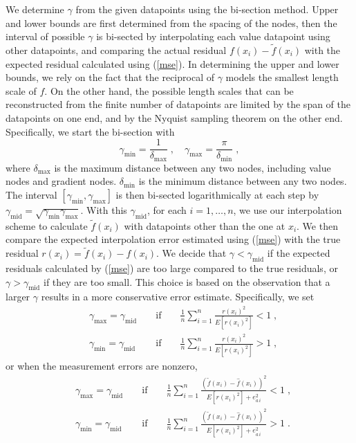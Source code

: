 We determine $\gamma$ from the given datapoints using the bi-section
method.  Upper and lower bounds are first determined from the spacing of the
nodes, then the interval of possible $\gamma$ is bi-sected by interpolating
each value datapoint using other datapoints, and comparing the
actual residual $f(x_i) - {\tilde f}(x_i)$ with the expected residual
calculated using (\ref{mse}).  In determining the upper and lower bounds,
we rely on the fact that the reciprocal of $\gamma$ models the smallest length
scale of $f$.  On the other hand, the possible length scales that can be
reconstructed from the finite number of datapoints are limited by the span of
the datapoints on one end, and by the Nyquist sampling theorem on the other
end.  Specifically, we start the bi-section with
\[ \gamma_{\min} = \frac{1}{\delta_{\max}}\;, \quad
   \gamma_{\max} = \frac{\pi}{\delta_{\min}}\;, \]
where $\delta_{\max}$ is the maximum distance between any two nodes, including
value nodes and gradient nodes.  $\delta_{\min}$ is the minimum distance
between any two nodes.  The interval $[\gamma_{\min}, \gamma_{\max}]$ is
then bi-sected logarithmically at each step by
$\gamma_{\mathrm{mid}} = \sqrt{\gamma_{\min} \gamma_{\max}}$.
With this $\gamma_{\mathrm{mid}}$, for each $i=1,\ldots,n$, we use our
interpolation scheme to calculate ${\tilde f}(x_i)$ with datapoints
other than the one at $x_i$.  We then compare the expected interpolation
error estimated using (\ref{mse}) with the true residual
$r(x_i) = {\tilde f}(x_i) - f(x_i)$.  We decide that
$\gamma < \gamma_{\mathrm{mid}}$ if the expected residuals calculated by
(\ref{mse}) are too large compared to the true residuals,
or $\gamma > \gamma_{\mathrm{mid}}$ if they are too small.
This choice is based on the observation that a larger $\gamma$ results in a
more conservative error estimate.  Specifically, we set
\[ \begin{aligned}
& \gamma_{\max} = \gamma_{\mathrm{mid}} && \mbox{ if } && \frac{1}{n}
  \sum_{i=1}^n \frac{r(x_i)^2}{\displaystyle E\left[r(x_i)^2\right]} < 1 \;,\\
& \gamma_{\min} = \gamma_{\mathrm{mid}} && \mbox{ if } && \frac{1}{n}
  \sum_{i=1}^n \frac{r(x_i)^2}{\displaystyle E\left[r(x_i)^2\right]} > 1 \;,
\end{aligned} \]
or when the measurement errors are nonzero,
\begin{equation} \begin{aligned} \label{bisect}
& \gamma_{\max} = \gamma_{\mathrm{mid}} && \mbox{ if } && \frac{1}{n}
  \sum_{i=1}^n \frac{\left({\tilde f}(x_i) - {\hat f}(x_i)\right)^2}
               {\displaystyle E\left[r(x_i)^2\right] + e_{a\,i}^2} < 1 \;,\\
& \gamma_{\min} = \gamma_{\mathrm{mid}} && \mbox{ if } && \frac{1}{n}
  \sum_{i=1}^n \frac{\left({\tilde f}(x_i) - {\hat f}(x_i)\right)^2}
               {\displaystyle E\left[r(x_i)^2\right] + e_{a\,i}^2} > 1 \;.
\end{aligned} \end{equation}
